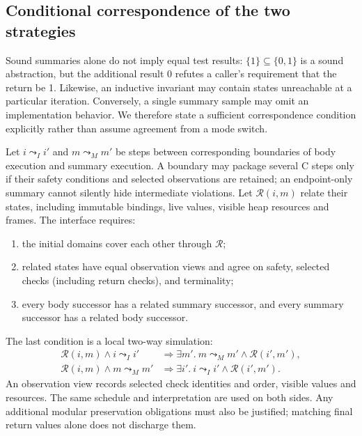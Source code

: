 \subsection{Conditional correspondence of the two strategies}
\label{sec:mode-correspondence}
Sound summaries alone do not imply equal test results:
$\{1\}\subseteq\{0,1\}$ is a sound abstraction, but the additional result
0 refutes a caller's requirement that the return be 1.
Likewise, an inductive invariant may contain states unreachable at a
particular iteration. Conversely, a single summary sample may omit an
implementation behavior. We therefore state a sufficient correspondence
condition explicitly rather than assume agreement from a mode switch.

Let $i\leadsto_I i'$ and $m\leadsto_M m'$ be steps between corresponding
boundaries of body execution and summary execution.
A boundary may package several C steps only if their safety conditions
and selected observations are retained; an endpoint-only summary cannot
silently hide intermediate violations.
Let $\mathcal R(i,m)$ relate their states, including immutable bindings,
live values, visible heap resources and frames.
The interface requires:
\begin{enumerate}
\item the initial domains cover each other through $\mathcal R$;
\item related states have equal observation views and agree on safety,
selected checks (including return checks), and terminality;
\item every body successor has a related summary successor, and every
summary successor has a related body successor.
\end{enumerate}
The last condition is a local two-way simulation:
\[
\begin{split}
\mathcal R(i,m)\land i\leadsto_I i'
 &\Rightarrow \exists m'.\ m\leadsto_M m'\land\mathcal R(i',m'),\\
\mathcal R(i,m)\land m\leadsto_M m'
 &\Rightarrow \exists i'.\ i\leadsto_I i'\land\mathcal R(i',m').
\end{split}
\]
An observation view records selected check identities and order, visible
values and resources. The same schedule and interpretation are used on both
sides. Any additional modular preservation obligations must also be
justified; matching final return values alone does not discharge them.

